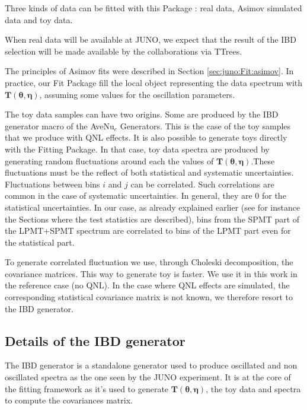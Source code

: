 \documentclass[../main.tex]{subfiles}
\begin{document}
Three kinds of data can be fitted with this Package : real data, Asimov simulated data and toy data.

When real data will be available at JUNO, we expect that the result of the IBD selection will be made available by the collaborations via TTrees.

The principles of Asimov fits were described in Section \ref{sec:juno:Fit:asimov}. In practice, our Fit Package fill the local object representing the data spectrum with $\bm{T}(\bm{\theta}, \bm{\eta})$, assuming some values for the oscillation parameters.

The toy data samples can have two origins. Some are produced by the IBD generator macro of the AveNu$_e$ Generators. This is the case of the toy samples that we produce with QNL effects. It is also possible to generate toys directly with the Fitting Package. In that case, toy data spectra are produced by generating random fluctuations around
each the values of $\bm{T}(\bm{\theta}, \bm{\eta})$.These fluctuations must be the reflect of both statistical and systematic uncertainties. Fluctuations between bins $i$ and $j$ can be correlated. Such correlations are common in the case of systematic uncertainties. In general, they are 0 for the statistical uncertainties. In our case, as already explained earlier (see for instance the Sections where the test statistics are described), bins from the SPMT part of the LPMT+SPMT spectrum are correlated to bins of the LPMT part even for the statistical part.

To generate correlated fluctuation we use, through Choleski decomposition, the covariance matrices. This way to generate toy is faster. We use it in this work in the reference case (no QNL). In the case where QNL effects are simulated, the corresponding statistical covariance matrix is not known, we therefore resort to the IBD generator.


%
%
%
%
\subsection{Details of the IBD generator}
\label{sec:joint_fit:framework:ibd-gen}

The IBD generator is a standalone generator used to produce oscillated and non oscillated spectra as the one seen by the JUNO experiment. It is at the core of the fitting framework as it's used to generate $\bm{T}(\bm{\theta}, \bm{\eta})$, the toy data and spectra to compute the covariances matrix.
\end{document}
